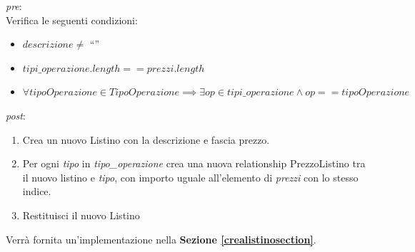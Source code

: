 \textit{pre}:\\
\hspace*{0.5 cm}Verifica le seguenti condizioni:
\begin{itemize}
  \item $descrizione \neq$ ``''
  \item $tipi\_operazione.length == prezzi.length$
  \item $\forall tipoOperazione \in Tipo Operazione \implies \exists op \in tipi\_operazione \land op == tipoOperazione $
\end{itemize}
\textit{post}:
\begin{enumerate}
  \item Crea un nuovo Listino con la descrizione e fascia prezzo.
  \item Per ogni \textit{tipo} in \textit{tipo\_operazione} crea una nuova relationship PrezzoListino tra il nuovo listino e \textit{tipo},
    con importo uguale all'elemento di \textit{prezzi} con lo stesso indice.
  \item Restituisci il nuovo Listino
\end{enumerate}

Verr\`a fornita un'implementazione nella \textbf{Sezione \ref{crealistinosection}}.
